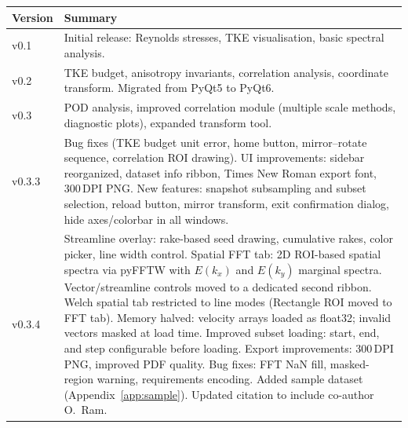 \documentclass[11pt, a4paper]{report}
\begin{document}
\begin{table}[htbp]
\centering
\begin{tabular}{lp{12cm}}
\toprule
\textbf{Version} & \textbf{Summary} \\
\midrule
v0.1   & Initial release: Reynolds stresses, TKE visualisation, basic spectral analysis. \\
v0.2   & TKE budget, anisotropy invariants, correlation analysis, coordinate transform. Migrated from PyQt5 to PyQt6. \\
v0.3   & POD analysis, improved correlation module (multiple scale methods, diagnostic plots), expanded transform tool. \\
v0.3.3 & Bug fixes (TKE budget unit error, home button, mirror--rotate sequence, correlation ROI drawing). UI improvements: sidebar reorganized, dataset info ribbon, Times New Roman export font, 300\,DPI PNG. New features: snapshot subsampling and subset selection, reload button, mirror transform, exit confirmation dialog, hide axes/colorbar in all windows. \\
v0.3.4 & Streamline overlay: rake-based seed drawing, cumulative rakes, color picker, line width control. Spatial FFT tab: 2D ROI-based spatial spectra via pyFFTW with $E(k_x)$ and $E(k_y)$ marginal spectra. Vector/streamline controls moved to a dedicated second ribbon. Welch spatial tab restricted to line modes (Rectangle ROI moved to FFT tab). Memory halved: velocity arrays loaded as float32; invalid vectors masked at load time. Improved subset loading: start, end, and step configurable before loading. Export improvements: 300\,DPI PNG, improved PDF quality. Bug fixes: FFT NaN fill, masked-region warning, requirements encoding. Added sample dataset (Appendix~\ref{app:sample}). Updated citation to include co-author O.\ Ram. \\
\bottomrule
\end{tabular}
\end{table}
\end{document}
